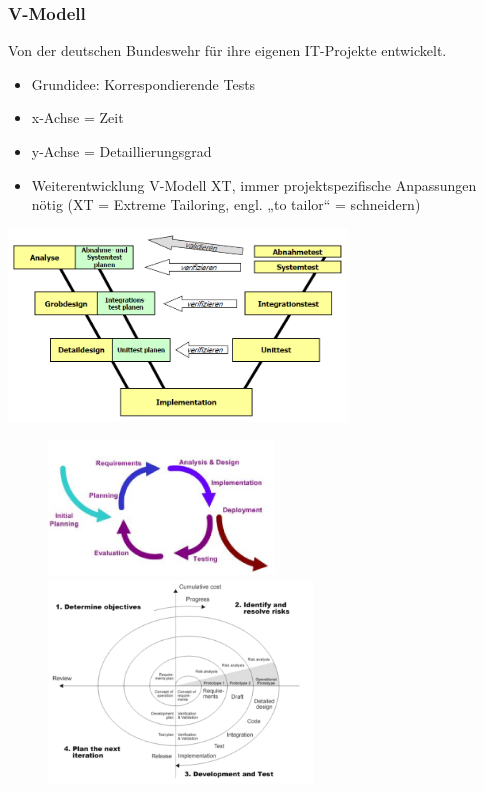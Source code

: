 \subsubsection{V-Modell}
Von der deutschen Bundeswehr für ihre eigenen IT-Projekte entwickelt.\\
\begin{minipage}{8cm}
	\begin{itemize}
		\item Grundidee: Korrespondierende Tests
		\item x-Achse = Zeit
		\item y-Achse = Detaillierungsgrad
		\item Weiterentwicklung V-Modell XT,\newline
        immer projektspezifische Anpassungen nötig\newline
        (XT = Extreme Tailoring, engl. „to tailor“ = schneidern)
	\end{itemize}
\end{minipage}
\begin{minipage}{9cm}
	\includegraphics[width=9cm]{images/vmodell}	
\end{minipage}
\begin{figure}
	\includegraphics[width=6cm]{images/iterative_entwicklung.png}
	\includegraphics[width=7cm]{images/spiral_modell.png}
\end{figure}

